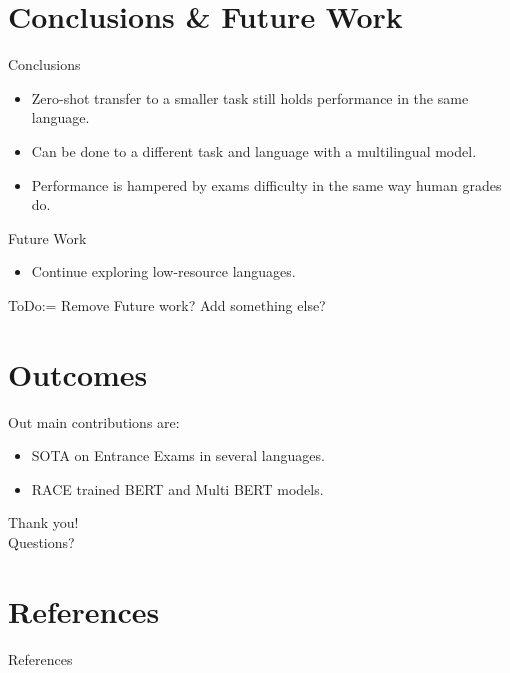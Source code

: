 \documentclass[]{beamer}
\begin{document}
\section{Conclusions \& Future Work}
  \begin{frame}{\secname}
    \begin{alertblock}{Conclusions}
      \begin{itemize}
        \item Zero-shot transfer to a smaller task still holds performance in the same language.
        \item Can be done to a different task and language with a multilingual model.
        \item Performance is hampered by exams difficulty in the same way human grades do.
      \end{itemize}
    \end{alertblock}
    \begin{alertblock}{Future Work}
      \begin{itemize}
        \item Continue exploring low-resource languages.
      \end{itemize}
      \alert{ToDo:= Remove Future work? Add something else?}
    \end{alertblock}
  \end{frame}

\section{Outcomes}
  \begin{frame}{\secname}
    \begin{alertblock}{Out main contributions are:}
      \begin{itemize}
        \item SOTA on Entrance Exams in several languages.
        \item RACE trained BERT and Multi BERT models.
      \end{itemize}
    \end{alertblock}
  \end{frame}


\begin{frame}[standout]
  Thank you!\\
  Questions?
\end{frame}

\section{References}
  \begin{frame}[allowframebreaks]{References}
    \printbibliography%
  \end{frame}
\end{document}
